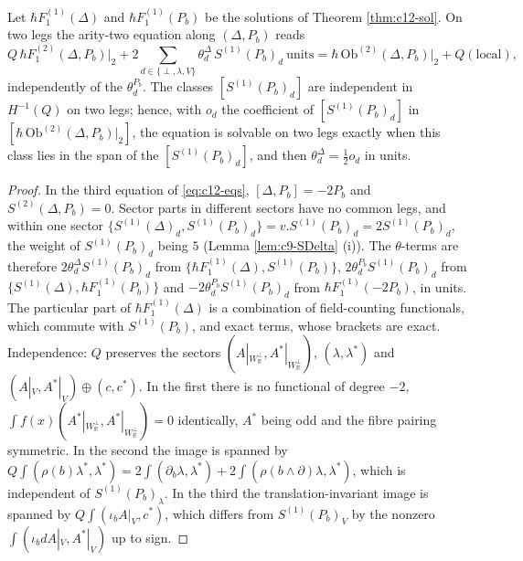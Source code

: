 \begin{theorem}
\label{thm:c12-theta}
Let $\hbar F_1^{(1)}(\Delta)$ and $\hbar F_1^{(1)}(P_b)$ be the solutions of Theorem \ref{thm:c12-sol}. On two legs the arity-two equation along $(\Delta,P_b)$ reads
\begin{equation}
Q\,\hbar F_1^{(2)}(\Delta,P_b)\big|_2+2\sum_{d\in\{\perp,\lambda,V\}}\theta^\Delta_d\,S^{(1)}(P_b)_d\ \text{units}=\hbar\,\mathrm{Ob}^{(2)}(\Delta,P_b)\big|_2+Q(\text{local}),
\label{eq:c12-theta}
\end{equation}
independently of the $\theta^{P_b}_d$. The classes $[S^{(1)}(P_b)_d]$ are independent in $H^{-1}(Q)$ on two legs; hence, with $o_d$ the coefficient of $[S^{(1)}(P_b)_d]$ in $[\hbar\,\mathrm{Ob}^{(2)}(\Delta,P_b)|_2]$, the equation is solvable on two legs exactly when this class lies in the span of the $[S^{(1)}(P_b)_d]$, and then $\theta^\Delta_d=\tfrac12o_d$ in units.
\end{theorem}

\begin{proof}
In the third equation of \eqref{eq:c12-eqs}, $[\Delta,P_b]=-2P_b$ and $S^{(2)}(\Delta,P_b)=0$. Sector parts in different sectors have no common legs, and within one sector $\{S^{(1)}(\Delta)_d,S^{(1)}(P_b)_d\}=v.S^{(1)}(P_b)_d=2S^{(1)}(P_b)_d$, the weight of $S^{(1)}(P_b)_d$ being $5$ (Lemma \ref{lem:c9-SDelta} (i)). The $\theta$-terms are therefore $2\theta^\Delta_dS^{(1)}(P_b)_d$ from $\{\hbar F_1^{(1)}(\Delta),S^{(1)}(P_b)\}$, $2\theta^{P_b}_dS^{(1)}(P_b)_d$ from $\{S^{(1)}(\Delta),\hbar F_1^{(1)}(P_b)\}$ and $-2\theta^{P_b}_dS^{(1)}(P_b)_d$ from $\hbar F_1^{(1)}(-2P_b)$, in units. The particular part of $\hbar F_1^{(1)}(\Delta)$ is a combination of field-counting functionals, which commute with $S^{(1)}(P_b)$, and exact terms, whose brackets are exact. Independence: $Q$ preserves the sectors $(A|_{W_{\mathbb R}^\perp},A^*|_{W_{\mathbb R}^\perp})$, $(\lambda,\lambda^*)$ and $(A|_V,A^*|_V)\oplus(c,c^*)$. In the first there is no functional of degree $-2$, $\int f(x)(A^*|_{W_{\mathbb R}^\perp},A^*|_{W_{\mathbb R}^\perp})=0$ identically, $A^*$ being odd and the fibre pairing symmetric. In the second the image is spanned by $Q\int(\rho(b)\lambda^*,\lambda^*)=2\int(\partial_b\lambda,\lambda^*)+2\int(\rho(b\wedge\partial)\lambda,\lambda^*)$, which is independent of $S^{(1)}(P_b)_\lambda$. In the third the translation-invariant image is spanned by $Q\int(\iota_bA|_V,c^*)$, which differs from $S^{(1)}(P_b)_V$ by the nonzero $\int(\iota_bdA|_V,A^*|_V)$ up to sign.
\end{proof}

